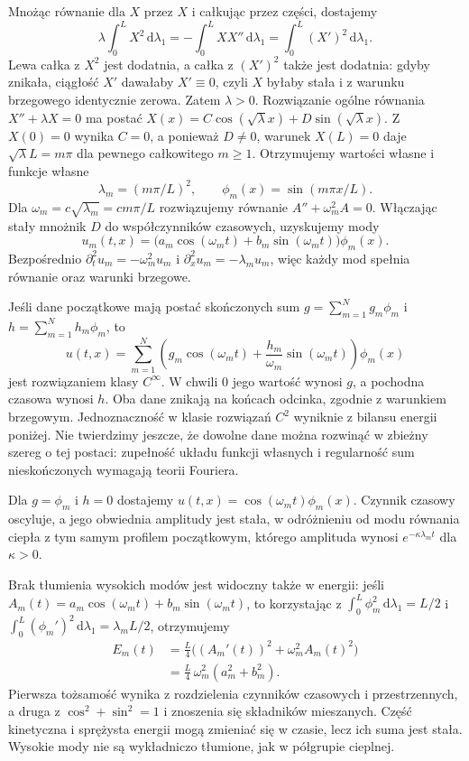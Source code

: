 Mnożąc równanie dla $X$ przez $X$ i całkując
przez części, dostajemy
\[
 \lambda\int_0^L X^2\,\mathrm d\lambda_1
 =-\int_0^L XX''\,\mathrm d\lambda_1
 =\int_0^L (X')^2\,\mathrm d\lambda_1.
\]
Lewa całka z $X^2$ jest dodatnia, a całka z $(X')^2$
także jest dodatnia: gdyby znikała, ciągłość $X'$
dawałaby $X'\equiv0$, czyli $X$ byłaby stała
i z warunku brzegowego identycznie zerowa.
Zatem $\lambda>0$. Rozwiązanie ogólne równania
$X''+\lambda X=0$ ma postać
$X(x)=C\cos(\sqrt\lambda x)+D\sin(\sqrt\lambda x)$.
Z $X(0)=0$ wynika $C=0$, a ponieważ $D\ne0$,
warunek $X(L)=0$ daje $\sqrt\lambda L=m\pi$
dla pewnego całkowitego $m\geq1$.
Otrzymujemy wartości własne i funkcje własne
\[
 \lambda_m=(m\pi/L)^2,\qquad
 \phi_m(x)=\sin(m\pi x/L).
\]
Dla $\omega_m=c\sqrt{\lambda_m}=cm\pi/L$
rozwiązujemy równanie $A''+\omega_m^2 A=0$.
Włączając stały mnożnik $D$ do współczynników
czasowych, uzyskujemy mody
\[
 u_m(t,x)=
 \bigl(a_m\cos(\omega_mt)+b_m\sin(\omega_mt)\bigr)
 \phi_m(x).
\]
Bezpośrednio $\partial_t^2u_m=-\omega_m^2u_m$
i $\partial_x^2u_m=-\lambda_m u_m$,
więc każdy mod spełnia równanie oraz warunki
brzegowe.

Jeśli dane początkowe mają postać skończonych sum
$g=\sum_{m=1}^N g_m\phi_m$ i
$h=\sum_{m=1}^N h_m\phi_m$, to
\[
 u(t,x)=\sum_{m=1}^N
 \left(g_m\cos(\omega_mt)+
       \frac{h_m}{\omega_m}\sin(\omega_mt)\right)\phi_m(x)
\]
jest rozwiązaniem klasy $C^\infty$.
W chwili $0$ jego wartość wynosi $g$, a pochodna
czasowa wynosi $h$. Oba dane znikają na końcach
odcinka, zgodnie z warunkiem brzegowym.
Jednoznaczność w klasie rozwiązań $C^2$
wyniknie z bilansu energii poniżej.
Nie twierdzimy jeszcze, że dowolne dane można
rozwinąć w zbieżny szereg o tej postaci:
zupełność układu funkcji własnych i regularność
sum nieskończonych wymagają teorii Fouriera.

\begin{przyklad}
Dla $g=\phi_m$ i $h=0$ dostajemy
$u(t,x)=\cos(\omega_mt)\phi_m(x)$.
Czynnik czasowy oscyluje, a jego obwiednia
amplitudy jest stała, w odróżnieniu od modu
równania ciepła z tym samym profilem początkowym,
którego amplituda wynosi $e^{-\kappa\lambda_m t}$
dla $\kappa>0$.

Brak tłumienia wysokich modów jest widoczny
także w energii: jeśli
$A_m(t)=a_m\cos(\omega_mt)+b_m\sin(\omega_mt)$,
to korzystając z
$\int_0^L\phi_m^2\,\mathrm d\lambda_1=L/2$
i $\int_0^L(\phi_m')^2\,\mathrm d\lambda_1
=\lambda_m L/2$, otrzymujemy
\[
 \begin{aligned}
 E_m(t)&=\frac L4\bigl((A_m'(t))^2+
                              \omega_m^2 A_m(t)^2\bigr)\\
       &=\frac L4\,\omega_m^2(a_m^2+b_m^2).
 \end{aligned}
\]
Pierwsza tożsamość wynika z rozdzielenia
czynników czasowych i przestrzennych, a druga
z $\cos^2+\sin^2=1$ i znoszenia się składników
mieszanych. Część kinetyczna i sprężysta
energii mogą zmieniać się w czasie, lecz ich
suma jest stała. Wysokie mody nie są wykładniczo
tłumione, jak w półgrupie cieplnej.
\end{przyklad}

